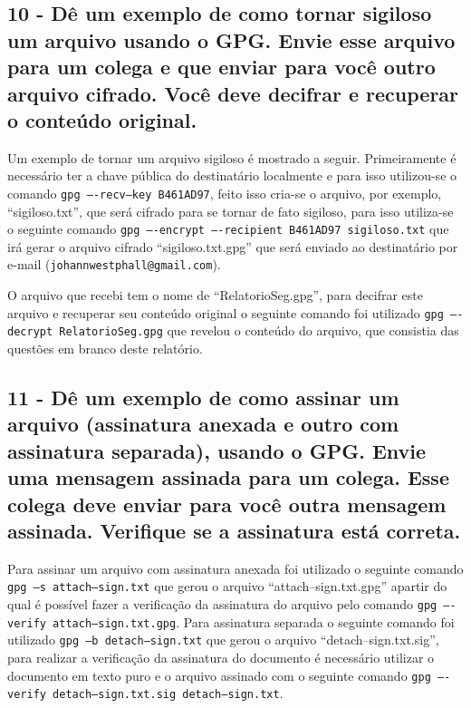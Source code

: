 \documentclass[
    article,            %
    11pt,               %
    oneside,            %
    a4paper,            %
    english,            %
    brazil,             %
    sumario=tradicional,
    ]{abntex2}
\begin{document}
\subsection*{\textbf{10 - Dê um exemplo de como tornar sigiloso um arquivo usando o GPG. Envie esse arquivo para um colega e que enviar para você outro arquivo cifrado. Você deve decifrar e recuperar o conteúdo original.}}

Um exemplo de tornar um arquivo sigiloso é mostrado a seguir. Primeiramente é necessário ter a chave pública do destinatário localmente e para isso utilizou-se o comando  \texttt{gpg ----recv--key B461AD97}, feito isso cria-se o arquivo, por exemplo, ``sigiloso.txt'', que será cifrado para se tornar de fato sigiloso, para isso utiliza-se o seguinte comando \texttt{gpg ----encrypt ----recipient B461AD97 sigiloso.txt} que irá gerar o arquivo cifrado ``sigiloso.txt.gpg'' que será enviado ao destinatário por e-mail (\texttt{johannwestphall@gmail.com}).

O arquivo que recebi tem o nome de ``RelatorioSeg.gpg'', para decifrar este arquivo e recuperar seu conteúdo original o seguinte comando foi utilizado \texttt{gpg ----decrypt RelatorioSeg.gpg} que revelou o conteúdo do arquivo, que consistia das questões em branco deste relatório. 

\subsection*{\textbf{11 - Dê um exemplo de como assinar um arquivo (assinatura anexada e outro com assinatura separada), usando o GPG. Envie uma mensagem assinada para um colega. Esse colega deve enviar para você outra mensagem assinada. Verifique se a assinatura está correta.}}

Para assinar um arquivo com assinatura anexada foi utilizado o seguinte comando \texttt{gpg --s attach--sign.txt} que gerou o arquivo ``attach--sign.txt.gpg'' apartir do qual é possível fazer a verificação da assinatura do arquivo pelo comando \texttt{gpg ----verify attach--sign.txt.gpg}. Para assinatura separada o seguinte comando foi utilizado \texttt{gpg --b detach--sign.txt} que gerou o arquivo ``detach--sign.txt.sig'', para realizar a verificação da assinatura do documento é necessário utilizar o documento em texto puro e o arquivo assinado com o seguinte comando \texttt{gpg ----verify detach--sign.txt.sig detach--sign.txt}.
\end{document}
